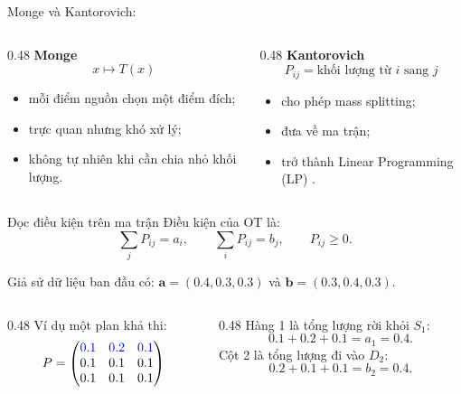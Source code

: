 \documentclass[10pt]{beamer}
\begin{document}
\begin{frame}{Monge và Kantorovich:}
    \begin{columns}[T]
        \begin{column}{0.48\textwidth}
            \textbf{Monge}
            \[
                x \mapsto T(x)
            \]
            \begin{itemize}
                \item mỗi điểm nguồn chọn một điểm đích;
                \item trực quan nhưng khó xử lý;
                \item không tự nhiên khi cần chia nhỏ khối lượng.
            \end{itemize}
        \end{column}
        \begin{column}{0.48\textwidth}
            \textbf{Kantorovich}
            \[
                P_{ij}=\text{khối lượng từ }i\text{ sang }j
            \]
            \begin{itemize}
                \item cho phép mass splitting;
                \item đưa về ma trận;
                \item trở thành Linear Programming (LP) \cite{peyre2019computational}.
            \end{itemize}
        \end{column}
    \end{columns}
\end{frame}
\begin{frame}{Đọc điều kiện trên ma trận}
    \small
    Điều kiện của OT là:
    \[
        \sum_j P_{ij}=a_i,\qquad
        \sum_i P_{ij}=b_j,\qquad
        P_{ij}\ge 0.
    \]

    \vspace{0.1cm}
    Giả sử dữ liệu ban đầu có: $\mathbf{a} = (0.4, 0.3, 0.3)$ và $\mathbf{b} = (0.3, 0.4, 0.3)$.

    \vspace{0.2cm}
    \begin{columns}[T]
        \begin{column}{0.48\textwidth}
            Ví dụ một plan khả thi:
            \[
            P=
            \begin{pmatrix}
            \color{blue}{0.1}&\color{blue}{0.2}&\color{blue}{0.1}\\
            0.1&0.1&0.1\\
            0.1&0.1&0.1
            \end{pmatrix}
            \]
        \end{column}
        \begin{column}{0.48\textwidth}
            Hàng 1 là tổng lượng rời khỏi $S_1$:
            \[
                0.1+0.2+0.1 = a_1 = 0.4.
            \]
            Cột 2 là tổng lượng đi vào $D_2$:
            \[
                0.2+0.1+0.1 = b_2 = 0.4.
            \]
        \end{column}
    \end{columns}
\end{frame}
\end{document}
